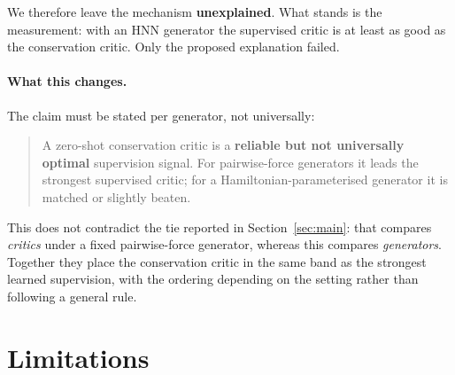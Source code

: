 \documentclass[11pt]{article}
\begin{document}
We therefore leave the mechanism \textbf{unexplained}. What stands is the measurement:
with an HNN generator the supervised critic is at least as good as the conservation
critic. Only the proposed explanation failed.

\paragraph{What this changes.} The claim must be stated per generator, not universally:

\begin{quote}
A zero-shot conservation critic is a \textbf{reliable but not universally optimal}
supervision signal. For pairwise-force generators it leads the strongest supervised
critic; for a Hamiltonian-parameterised generator it is matched or slightly beaten.
\end{quote}

This does not contradict the tie reported in Section~\ref{sec:main}: that compares
\emph{critics} under a fixed pairwise-force generator, whereas this compares
\emph{generators}. Together they place the conservation critic in the same band as the
strongest learned supervision, with the ordering depending on the setting rather than
following a general rule.

\section{Limitations}
\end{document}
